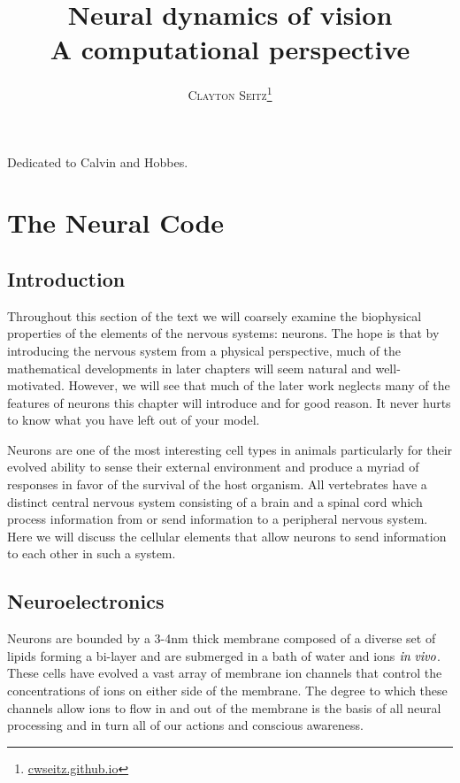 \documentclass[a4paper,11pt]{book}
\title{\Huge \textbf{Neural dynamics of vision}  \\ \huge A computational perspective}
\author{\textsc{Clayton Seitz}\thanks{\url{cwseitz.github.io}}}
\newenvironment{dedication}
{
   \cleardoublepage
   \thispagestyle{empty}
   \vspace*{\stretch{1}}
   \hfill\begin{minipage}[t]{0.66\textwidth}
   \raggedright
}
{
   \end{minipage}
   \vspace*{\stretch{3}}
   \clearpage
}
\begin{document}
\frontmatter
\maketitle

\begin{dedication}
Dedicated to Calvin and Hobbes.
\end{dedication}

\tableofcontents
\mainmatter

\chapter{The Neural Code}

\section{Introduction}

Throughout this section of the text we will coarsely examine the biophysical properties of the elements of the nervous systems: neurons. The hope is that by introducing the nervous system from a physical perspective, much of the mathematical developments in later chapters will seem natural and well-motivated. However, we will see that much of the later work neglects many of the features of neurons this chapter will introduce and for good reason. It never hurts to know what you have left out of your model.

Neurons are one of the most interesting cell types in animals particularly for their evolved ability to sense their external environment and produce a myriad of responses in favor of the survival of the host organism. All vertebrates have a distinct central nervous system consisting of a brain and a spinal cord which process information from or send information to a peripheral nervous system. Here we will discuss the cellular elements that allow neurons to send information to each other in such a system.

\section{Neuroelectronics}

Neurons are bounded by a 3-4nm thick membrane composed of a diverse set of lipids forming a bi-layer and are submerged in a bath of water and ions $\it{in \;vivo}$. These cells have evolved a vast array of membrane ion channels that control the concentrations of ions on either side of the membrane. The degree to which these channels allow ions to flow in and out of the membrane is the basis of all neural processing and in turn all of our actions and conscious awareness. 
\end{document}
